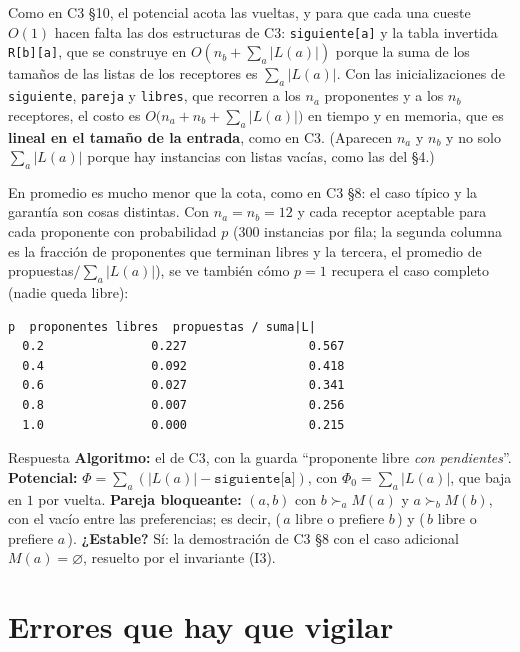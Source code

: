 \documentclass[11pt]{article}
\begin{document}
Como en C3 §10, el potencial acota las vueltas, y para que cada una cueste $O(1)$ hacen falta las dos
estructuras de C3: \texttt{siguiente[a]} y la tabla invertida \texttt{R[b][a]}, que se construye en
$O(n_b+\sum_a|L(a)|)$ porque la suma de los tamaños de las listas de los receptores es $\sum_a|L(a)|$. Con las
inicializaciones de \texttt{siguiente}, \texttt{pareja} y \texttt{libres}, que recorren a los $n_a$ proponentes y a los $n_b$ receptores, el
costo es $O\bigl(n_a+n_b+\sum_a|L(a)|\bigr)$ en tiempo y en memoria, que es \textbf{lineal en el tamaño de la entrada},
como en C3. (Aparecen $n_a$ y $n_b$ y no solo $\sum_a|L(a)|$ porque hay instancias con listas vacías, como las del §4.)

En promedio es mucho menor que la cota, como en C3 §8: el caso típico y la garantía son cosas distintas. Con
$n_a=n_b=12$ y cada receptor aceptable para cada proponente con probabilidad $p$ (300 instancias por fila; la segunda
columna es la fracción de proponentes que terminan libres y la tercera, el promedio de propuestas$/\sum_a|L(a)|$),
se ve también cómo $p=1$ recupera el caso completo (nadie queda libre):
\begin{lstlisting}[style=salida,basicstyle=\ttfamily\footnotesize\color{black},columns=fixed]
    p  proponentes libres  propuestas / suma|L|
  0.2               0.227                 0.567
  0.4               0.092                 0.418
  0.6               0.027                 0.341
  0.8               0.007                 0.256
  1.0               0.000                 0.215
\end{lstlisting}

\begin{resultado}{Respuesta}
\textbf{Algoritmo:} el de C3, con la guarda ``proponente libre \emph{con pendientes}''. \textbf{Potencial:}
$\Phi=\sum_a(|L(a)|-\texttt{siguiente[a]})$, con $\Phi_0=\sum_a|L(a)|$, que baja en $1$ por vuelta.
\textbf{Pareja bloqueante:} $(a,b)$ con $b\succ_aM(a)$ y $a\succ_bM(b)$, con el vacío entre las preferencias; es
decir, (\,$a$ libre o prefiere $b$\,) y (\,$b$ libre o prefiere $a$\,). \textbf{¿Estable?} Sí: la demostración de C3
§8 con el caso adicional $M(a)=\varnothing$, resuelto por el invariante (I3).
\end{resultado}

\section*{Errores que hay que vigilar}
\end{document}
